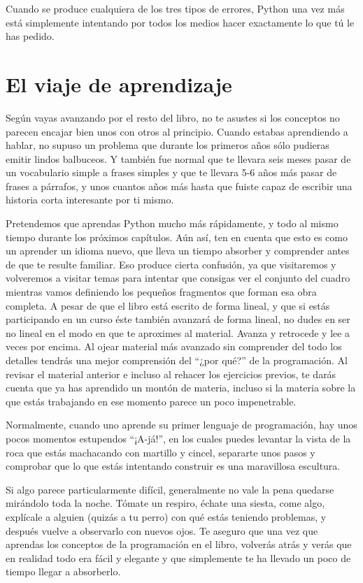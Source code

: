 Cuando se produce cualquiera de los tres tipos de errores, Python una vez más está
simplemente intentando por todos los medios hacer exactamente lo que tú le has pedido.

\section{El viaje de aprendizaje}

Según vayas avanzando por el resto del libro, no te asustes si los conceptos
no parecen encajar bien unos con otros al principio. Cuando estabas aprendiendo a hablar,
no supuso un problema que durante los primeros años sólo pudieras emitir lindos
balbuceos. Y también fue normal que te llevara seis meses pasar de un vocabulario simple
a frases simples y que te llevara 5-6 años más pasar de frases a párrafos, y unos cuantos
años más hasta que fuiste capaz de escribir una historia corta interesante por ti mismo.

Pretendemos que aprendas Python mucho más rápidamente, y todo al mismo tiempo
durante los próximos capítulos.
Aún así, ten en cuenta que esto es como un aprender un idioma nuevo, que lleva un tiempo
absorber y comprender antes de que te resulte familiar.
Eso produce cierta confusión, ya que visitaremos y volveremos a visitar
temas para intentar que consigas ver el conjunto del cuadro mientras vamos definiendo
los pequeños fragmentos que forman esa obra completa. A pesar de que el libro está
escrito de forma lineal, y que si estás participando en un curso éste también avanzará
de forma lineal, no dudes en ser no lineal en el modo en que te aproximes al material.
Avanza y retrocede y lee a veces por encima. Al ojear material más avanzado sin comprender del
todo los detalles tendrás una mejor comprensión del ``¿por qué?'' de la programación.
Al revisar el material anterior e incluso al rehacer los ejercicios previos,
te darás cuenta que ya has aprendido un montón de materia, incluso si la materia
sobre la que estás trabajando en ese momento parece un poco impenetrable.

Normalmente, cuando uno aprende su primer lenguaje de programación, hay unos pocos
momentos estupendos ``¡A-já!'', en los cuales puedes levantar la vista de la roca que
estás machacando con martillo y cincel, separarte unos pasos y comprobar
que lo que estás intentando construir es una maravillosa escultura.

Si algo parece particularmente difícil, generalmente no vale la pena quedarse mirándolo
toda la noche. Tómate un respiro, échate una siesta, come algo, explícale a alguien
(quizás a tu perro) con qué estás teniendo problemas, y después vuelve a observarlo con nuevos
ojos. Te aseguro que una vez que aprendas los conceptos de la programación en
el libro, volverás atrás y verás que en realidad todo era fácil y elegante y que
simplemente te ha llevado un poco de tiempo llegar a absorberlo.

